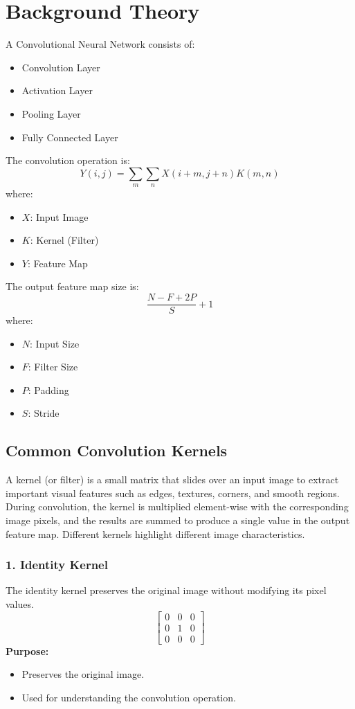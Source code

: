 \documentclass[11pt]{article}
\begin{document}
\section{Background Theory}
A Convolutional Neural Network consists of:
\begin{itemize}
    \item Convolution Layer
    \item Activation Layer
    \item Pooling Layer
    \item Fully Connected Layer
\end{itemize}

The convolution operation is:
\[
Y(i,j) = \sum_{m}\sum_{n} X(i+m,j+n) K(m,n)
\]
where:
\begin{itemize}[label={}]
    \item $X$: Input Image
    \item $K$: Kernel (Filter)
    \item $Y$: Feature Map
\end{itemize}

The output feature map size is:
\[
\frac{N - F + 2P}{S} + 1
\]
where:
\begin{itemize}[label={}]
    \item $N$: Input Size
    \item $F$: Filter Size
    \item $P$: Padding
    \item $S$: Stride
\end{itemize}

\subsection{Common Convolution Kernels}
A kernel (or filter) is a small matrix that slides over an input image to extract important visual features such as edges, textures, corners, and smooth regions. During convolution, the kernel is multiplied element-wise with the corresponding image pixels, and the results are summed to produce a single value in the output feature map. Different kernels highlight different image characteristics.

\subsubsection*{1. Identity Kernel}
The identity kernel preserves the original image without modifying its pixel values.
\[
\begin{bmatrix}
0 & 0 & 0 \\
0 & 1 & 0 \\
0 & 0 & 0
\end{bmatrix}
\]
\textbf{Purpose:}
\begin{itemize}
    \item Preserves the original image.
    \item Used for understanding the convolution operation.
\end{itemize}
\end{document}
